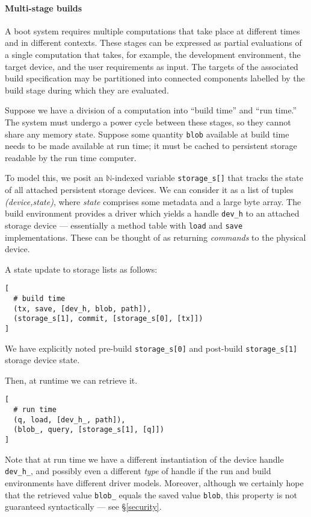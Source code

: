 \paragraph{Multi-stage builds}

A boot system requires multiple computations that take place at different times and in different contexts. 
%
These stages can be expressed as partial evaluations of a single computation that takes, for example, the development environment, the target device, and the user requirements as input.
%
The targets of the associated build specification may be partitioned into connected components labelled by the build stage during which they are evaluated.

\begin{example} \label{cache}

  Suppose we have a division of a computation into ``build time'' and ``run time.''
  The system must undergo a power cycle between these stages, so they cannot share any memory state.
  Suppose some quantity \texttt{blob} available at build time needs to be made available at run time; it must be cached to persistent storage readable by the run time computer.

  To model this, we posit an $\mathbb{N}$-indexed variable \texttt{storage\_s[]} that tracks the state of all attached persistent storage devices.
  We can consider it as a list of tuples \emph{(device,state)}, where \emph{state} comprises some metadata and a large byte array.
  The build environment provides a driver which yields a handle \texttt{dev\_h} to an attached storage device --- essentially a method table with \texttt{load} and \texttt{save} implementations.
  These can be thought of as returning \emph{commands} to the physical device.
  
  A state update to storage lists as follows:
  \begin{lstlisting}
[
  # build time
  (tx, save, [dev_h, blob, path]),
  (storage_s[1], commit, [storage_s[0], [tx]])
]
  \end{lstlisting}
  We have explicitly noted pre-build \texttt{storage\_s[0]} and post-build \texttt{storage\_s[1]} storage device state.
  
  Then, at runtime we can retrieve it.
  \begin{lstlisting}
[
  # run time
  (q, load, [dev_h_, path]),
  (blob_, query, [storage_s[1], [q]])
]
  \end{lstlisting}
  Note that at run time we have a different instantiation of the device handle \texttt{dev\_h\_}, and possibly even a different \emph{type} of handle if the run and build environments have different driver models.
  Moreover, although we certainly hope that the retrieved value \texttt{blob\_} equals the saved value \texttt{blob}, this property is not guaranteed syntactically --- see \S\ref{security}.

\end{example}


